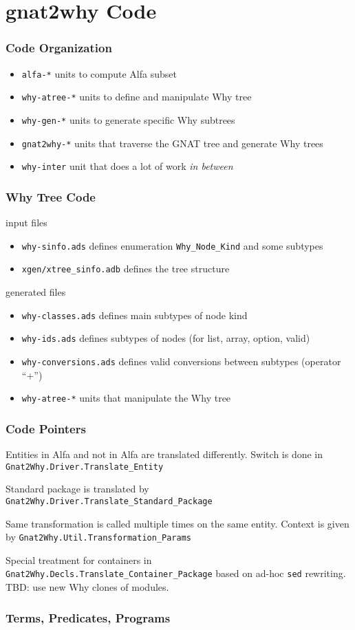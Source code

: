 \documentclass{beamer}
\newcommand{\vs}{\vspace{0.5cm}}
\newenvironment{specialframe}{%
  \begin{frame}[fragile,environment=specialframe]}{\end{frame}}
\begin{document}
\section{gnat2why Code}

\begin{specialframe}\frametitle{Code Organization}
   \begin{itemize}
      \item \verb|alfa-*|       units to compute Alfa subset
      \item \verb|why-atree-*|  units to define and manipulate Why tree
      \item \verb|why-gen-*|    units to generate specific Why subtrees
      \item \verb|gnat2why-*|   units that traverse the GNAT tree and generate
         Why trees
      \item \verb|why-inter|    unit that does a lot of work \emph{in between}
   \end{itemize}
\end{specialframe}

\begin{specialframe}\frametitle{Why Tree Code}
  input files
  \begin{itemize}
  \item \verb|why-sinfo.ads|  defines enumeration \verb|Why_Node_Kind| and some subtypes
  \item \verb|xgen/xtree_sinfo.adb| defines the tree structure
  \end{itemize}

\vs
  generated files
  \begin{itemize}
  \item \verb|why-classes.ads| defines main subtypes of node kind
  \item \verb|why-ids.ads|    defines subtypes of nodes (for list, array, option, valid)
  \item \verb|why-conversions.ads|    defines valid conversions between subtypes (operator ``+'')
  \item \verb|why-atree-*|   units that manipulate the Why tree
   \end{itemize}
\end{specialframe}

\begin{specialframe}\frametitle{Code Pointers}

  Entities in Alfa and not in Alfa are translated differently. Switch is done
  in \verb|Gnat2Why.Driver.Translate_Entity|

\vs

Standard package is translated by
\verb|Gnat2Why.Driver.Translate_Standard_Package|

\vs

  Same transformation is called multiple times on the same entity. Context is
  given by \verb|Gnat2Why.Util.Transformation_Params|

\vs

Special treatment for containers in
\verb|Gnat2Why.Decls.Translate_Container_Package| based on ad-hoc \verb|sed|
rewriting. TBD: use new Why clones of modules.

\end{specialframe}

\begin{specialframe}\frametitle{Terms, Predicates, Programs}

\end{specialframe}
\end{document}
